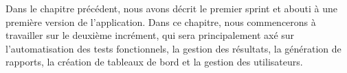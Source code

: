 Dans le chapitre précédent, nous avons décrit le premier sprint et abouti à une première version de l’application. Dans ce chapitre, nous commencerons à travailler sur le deuxième incrément, qui sera principalement axé sur l'automatisation des tests fonctionnels, la gestion des résultats, la génération de rapports, la création de tableaux de bord et la gestion des utilisateurs.